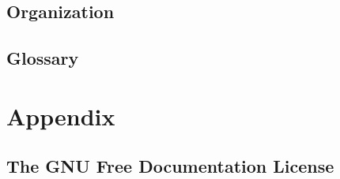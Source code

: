 %
%
%
%
%
\newcommand\starputitle{StarPU Handbook - StarPU Introduction}
\setcounter{tocdepth}{2}


\chapter{Organization}
\label{index}
\hypertarget{index}{}


\chapter{Glossary}
\label{Glossary}
\hypertarget{Glossary}{}


\part{Appendix}

\chapter{The GNU Free Documentation License}
\label{GNUFreeDocumentationLicense}
\hypertarget{GNUFreeDocumentationLicense}{}




